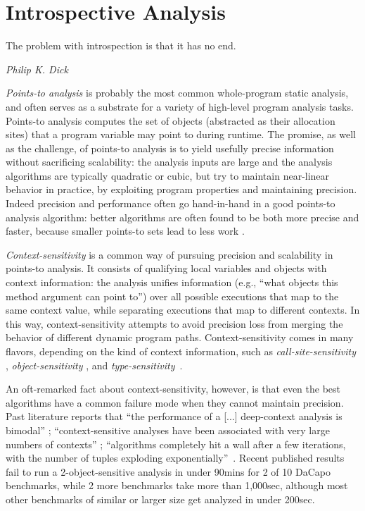 \chapter{Introspective Analysis} \label{chapter:introspective}

\epigraph{The problem with introspection is that it has no end.}{\textit{Philip K. Dick}}

\emph{Points-to analysis} is probably the most common whole-program
static analysis, and often serves as a substrate for a variety of
high-level program analysis tasks. Points-to analysis computes the set
of objects (abstracted as their allocation sites) that a program
variable may point to during runtime. The promise, as well as the
challenge, of points-to analysis is to yield usefully precise
information without sacrificing scalability: the analysis inputs are
large and the analysis algorithms are typically quadratic or cubic,
but try to maintain near-linear behavior in practice, by exploiting
program properties and maintaining precision. Indeed precision and
performance often go hand-in-hand in a good points-to analysis
algorithm: better algorithms are often found to be both more precise
and faster, because smaller points-to sets lead to less work
\cite{1391987}.

\emph{Context-sensitivity} is a common way of pursuing precision and
scalability in points-to analysis. It consists of qualifying local
variables and objects with context information: the analysis unifies
information (e.g., ``what objects this method argument can point to'')
over all possible executions that map to the same context value, while
separating executions that map to different contexts. In this way,
context-sensitivity attempts to avoid precision loss from merging the
behavior of different dynamic program paths. Context-sensitivity comes
in many flavors, depending on the kind of context information, such as
\emph{call-site-sensitivity}
\cite{Sharir:Interprocedural,Shivers:1991:diss},
\emph{object-sensitivity}
\cite{Milanova:2002:POS:566172.566174,1044835}, and
\emph{type-sensitivity}~\cite{pointsto-popl11}.

An oft-remarked fact about context-sensitivity, however, is that even
the best algorithms have a common failure mode when they cannot
maintain precision. Past literature reports that ``the performance of
a [...]  deep-context analysis is bimodal'' \cite{pointsto-popl11};
``context-sensitive analyses have been associated with very large
numbers of contexts'' \cite{DBLP:conf/cc/LhotakH06}; ``algorithms
completely hit a wall after a few iterations, with the number of
tuples exploding
exponentially''~\cite{Liang:2011:SAR:1993498.1993567}.  Recent
published results~\cite{hybrid-pldi13} fail to run a
2-object-sensitive analysis in under 90mins for 2 of 10 DaCapo
benchmarks, while 2 more benchmarks take more than 1,000sec, although
most other benchmarks of similar or larger size get analyzed in under
200sec.


